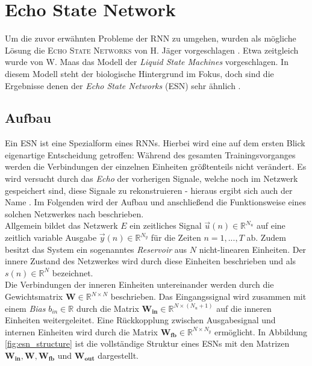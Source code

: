 \section{Echo State Network}
\label{sc:esn}
Um die zuvor erwähnten Probleme der \textsc{RNN} zu umgehen, wurden als mögliche Lösung die \textsc{Echo State Networks} von H. Jäger vorgeschlagen \cite{jaeger2010}. Etwa zeitgleich wurde von W. Maas das Modell der \textit{Liquid State Machines} vorgeschlagen. In diesem Modell steht der biologische Hintergrund im Fokus, doch sind die Ergebnisse denen der \textit{Echo State Networks} (\textsc{ESN}) sehr ähnlich \citep{Maass2011}. 

\subsection{Aufbau}
\label{sec:esn_structure}
Ein \textsc{ESN} ist eine Spezialform eines \textsc{RNN}s. Hierbei wird eine auf dem ersten Blick eigenartige Entscheidung getroffen: Während des gesamten Trainingsvorganges werden die Verbindungen der einzelnen Einheiten größtenteils nicht verändert. Es wird versucht durch das \textit{Echo} der vorherigen Signale, welche noch im Netzwerk gespeichert sind, diese Signale zu rekonstruieren - hieraus ergibt sich auch der Name \cite{lukoseviciusa2009}. Im Folgenden wird der Aufbau und anschließend die Funktionsweise eines solchen Netzwerkes nach \citep{jaeger2007} beschrieben.\\

Allgemein bildet das Netzwerk $E$ ein zeitliches Signal $\vec{u}(n) \in \mathbb{R}^{N_u}$  auf eine zeitlich variable Ausgabe $\vec{y}(n) \in \mathbb{R}^{N_y}$ für die Zeiten $n=1, ..., T$ ab. Zudem besitzt das System ein sogenanntes \textit{Reservoir} aus $N$ nicht-linearen Einheiten. Der innere Zustand des Netzwerkes wird durch diese Einheiten beschrieben und als $s(n) \in \mathbb{R}^{N}$ bezeichnet.\\

Die Verbindungen der inneren Einheiten untereinander werden durch die Gewichtsmatrix $\mathbf{W} \in \mathbb{R}^{N \times N}$ beschrieben. Das Eingangssignal wird zusammen mit einem \textit{Bias} $b_{in} \in \mathbb{R}$ durch die Matrix $\mathbf{W_{in}} \in \mathbb{R}^{N \times (N_u+1)}$ auf die inneren Einheiten weitergeleitet. Eine Rückkopplung zwischen Ausgabesignal und internen Einheiten wird durch die Matrix $\mathbf{W_{fb}} \in \mathbb{R}^{N \times N_y}$ ermöglicht. In Abbildung \ref{fig:esn_structure} ist die vollständige Struktur eines \textsc{ESN}s mit den Matrizen $\mathbf{W_{in}}, \mathbf{W}, \mathbf{W_{fb}}$ und $\mathbf{W_{out}}$ dargestellt.

